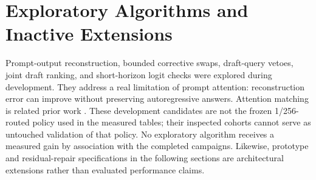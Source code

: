 \section{Exploratory Algorithms and Inactive Extensions}
Prompt-output reconstruction, bounded corrective swaps, draft-query vetoes,
joint draft ranking, and short-horizon logit checks were explored during
development. They address a real limitation of prompt attention: reconstruction
error can improve without preserving autoregressive answers. Attention matching
is related prior work \citep{attentionmatching2026}. These development
candidates are not the frozen 1/256-routed policy used in the measured tables;
their inspected cohorts cannot serve as untouched validation of that policy.
No exploratory algorithm receives a measured gain by association with the
completed campaigns. Likewise, prototype and residual-repair specifications
in the following sections are architectural extensions rather than evaluated
performance claims.
